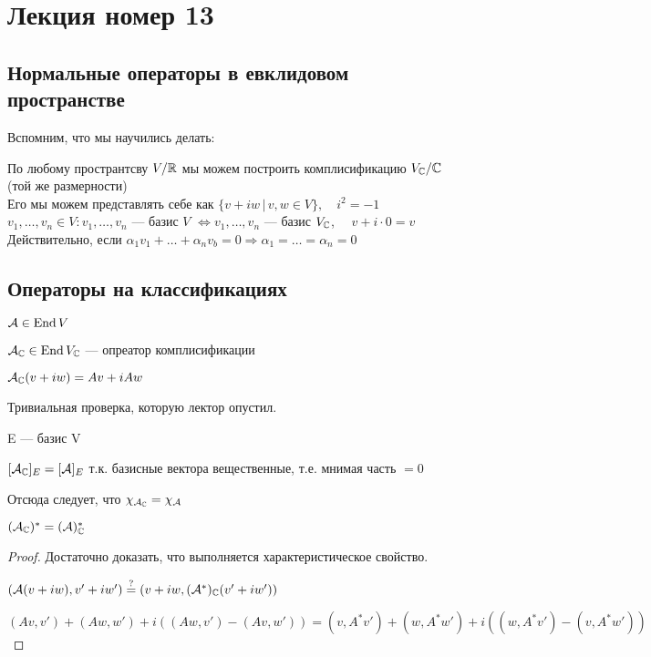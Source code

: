 \section{Лекция номер 13}

\subsection*{Нормальные операторы в евклидовом пространстве}

Вспомним, что мы научились делать:

    По любому пространтсву $V / \mathbb{R}$ мы можем построить комплисификацию $V_{\mathbb{C}} / \mathbb{C}$ (той же размерности) \\
    Его мы можем представлять себе как $ \{ v + iw \, | \, v,w \in V \}, \quad i^2 = -1 $ \\
    $v_1, \dots, v_n \in V: v_1, \dots, v_n$ --- базис $V$ $\Longleftrightarrow v_1, \dots, v_n$ --- базис $V_{\mathbb{C}}$, $\quad v + i \cdot 0 = v$
    Действительно, если $\alpha_1 v_1 + \dots + \alpha_n v_b = 0 \Longrightarrow \alpha_1 = \dots = \alpha_n = 0$
    

\subsection*{Операторы на классификациях}

\begin{conj}
$ \mathcal{A} \in \operatorname{End}{V} $

$ \mathcal{A}_{\mathbb{C}} \in \operatorname{End}{V_{\mathbb{C}}}  $ --- опреатор комплисификации

$ \mathcal{A}_{\mathbb{C}}(v + iw) = Av + iAw $

Тривиальная проверка, которую лектор опустил.
\end{conj}

\begin{conj}
E --- базис V

$[\mathcal{A}_{\mathbb{C}}]_{E} = [\mathcal{A}]_{E}$ т.к. базисные вектора вещественные, т.е. мнимая часть $ = 0$

Отсюда следует, что $\chi_{\mathcal{A}_{\mathbb{C}}} = \chi_{\mathcal{A}}$
\end{conj}

\begin{lemma}

    $ (\mathcal{A}_{\mathbb{C}})^* = (\mathcal{A})^*_{\mathbb{C}} $

    \begin{proof}
    \emptyln
    Достаточно доказать, что выполняется характеристическое свойство.

    $(\mathcal{A}(v + iw), v' + iw') \stackrel{?}{=} (v + iw, (\mathcal{A}^*)_{\mathbb{C}}(v' + iw'))$

    $(A v, v') + (A w, w') + i ((A w, v') - (A v, w')) = (v, A^* v') + (w, A^* w') + i ( (w, A^* v') - (v, A^* w') )$ 
    \end{proof}
\end{lemma}

